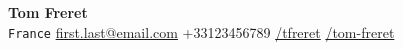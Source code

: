 \documentclass[letterpaper,11pt]{article}
\begin{document}
\begin{center}
  \textbf{\Huge Tom Freret} \\ \vspace{3pt}
  \small \faMapMarker* \hspace{2pt}\texttt{France} \hspace{1pt}
  \hspace{1pt} \faEnvelope \hspace{2pt} \href{mailto:first.last@email.com}{first.last@email.com} \hspace{1pt}
  \hspace{1pt} \faPhone \hspace{2pt} +33123456789 \hspace{1pt}
  \hspace{1pt} \faGithub \hspace{2pt} \href{https://github.com/tfreret}{/tfreret} \hspace{1pt}
  \hspace{1pt} \faLinkedinIn \hspace{2pt} \href{https://linkedin.com/tom-freret}{/tom-freret} \hspace{1pt}
\end{center}



\end{document}
